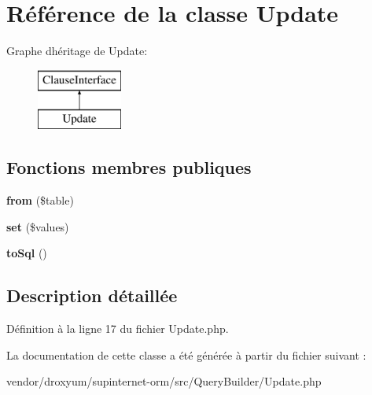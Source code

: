 \hypertarget{class_o_r_m_1_1_query_builder_1_1_update}{}\section{Référence de la classe Update}
\label{class_o_r_m_1_1_query_builder_1_1_update}
Graphe d\textquotesingle{}héritage de Update\+:\begin{figure}[H]
\begin{center}
\leavevmode
\includegraphics[height=2.000000cm]{class_o_r_m_1_1_query_builder_1_1_update}
\end{center}
\end{figure}
\subsection*{Fonctions membres publiques}
\begin{DoxyCompactItemize}
\item 
{\bfseries from} (\$table)\hypertarget{class_o_r_m_1_1_query_builder_1_1_update_ac13b3019b235987db688007a12422882}{}\label{class_o_r_m_1_1_query_builder_1_1_update_ac13b3019b235987db688007a12422882}

\item 
{\bfseries set} (\$values)\hypertarget{class_o_r_m_1_1_query_builder_1_1_update_a8bdfe0a5256e35367225bcd6d278ef21}{}\label{class_o_r_m_1_1_query_builder_1_1_update_a8bdfe0a5256e35367225bcd6d278ef21}

\item 
{\bfseries to\+Sql} ()\hypertarget{class_o_r_m_1_1_query_builder_1_1_update_a63f8ba861f1ecabe359d454fde60d395}{}\label{class_o_r_m_1_1_query_builder_1_1_update_a63f8ba861f1ecabe359d454fde60d395}

\end{DoxyCompactItemize}


\subsection{Description détaillée}


Définition à la ligne 17 du fichier Update.\+php.



La documentation de cette classe a été générée à partir du fichier suivant \+:\begin{DoxyCompactItemize}
\item 
vendor/droxyum/supinternet-\/orm/src/\+Query\+Builder/Update.\+php\end{DoxyCompactItemize}
